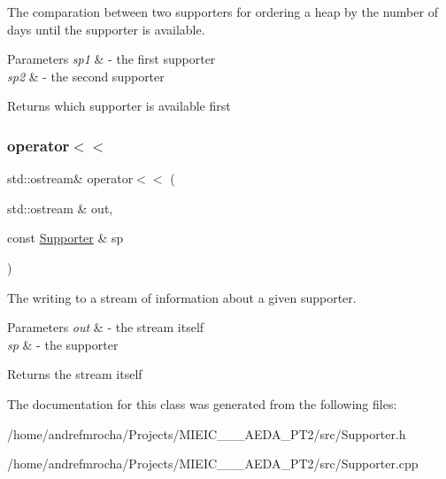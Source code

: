 The comparation between two supporters for ordering a heap by the number of days until the supporter is available. 


\begin{DoxyParams}{Parameters}
{\em sp1} & -\/ the first supporter \\
\hline
{\em sp2} & -\/ the second supporter \\
\hline
\end{DoxyParams}
\begin{DoxyReturn}{Returns}
which supporter is available first 
\end{DoxyReturn}
\mbox{\label{class_supporter_a7f6725df03a27dab255cbcef909e590e}} 
\subsubsection{\texorpdfstring{operator$<$$<$}{operator<<}}
{\footnotesize\ttfamily std\+::ostream\& operator$<$$<$ (\begin{DoxyParamCaption}\item[{std\+::ostream \&}]{out,  }\item[{const \mbox{\hyperlink{class_supporter}{Supporter}} \&}]{sp }\end{DoxyParamCaption})\hspace{0.3cm}{\ttfamily [friend]}}



The writing to a stream of information about a given supporter. 


\begin{DoxyParams}{Parameters}
{\em out} & -\/ the stream itself \\
\hline
{\em sp} & -\/ the supporter \\
\hline
\end{DoxyParams}
\begin{DoxyReturn}{Returns}
the stream itself 
\end{DoxyReturn}


The documentation for this class was generated from the following files\+:\begin{DoxyCompactItemize}
\item 
/home/andrefmrocha/\+Projects/\+M\+I\+E\+I\+C\+\_\+\_\+\_\+\+A\+E\+D\+A\+\_\+\+P\+T2/src/Supporter.\+h\item 
/home/andrefmrocha/\+Projects/\+M\+I\+E\+I\+C\+\_\+\_\+\_\+\+A\+E\+D\+A\+\_\+\+P\+T2/src/Supporter.\+cpp\end{DoxyCompactItemize}
